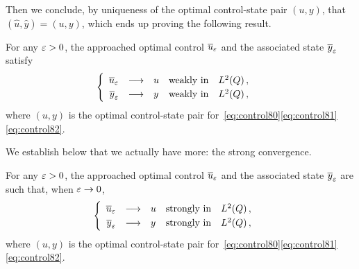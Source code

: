 Then we conclude, by uniqueness of the optimal control-state pair $(u,y)$,
that $\left({\hat{u},\hat{y}}\right) = (u,y)$, which ends up proving the
following result.

\begin{proposition}%
    For any $\varepsilon > 0$, the approached optimal control ${\overline{u}}_{\varepsilon}$ and
    the associated state ${\overline{y}}_{\varepsilon}$ satisfy
    \begin{equation*}
        \begin{cases}\displaystyle
            \begin{array}{rclll}
                {\overline{u}}_{\varepsilon} & \longrightarrow & u & \text{weakly in} &
                L^{2}\!\left({Q}\right),\\
                {\overline{y}}_{\varepsilon} & \longrightarrow & y & \text{weakly in} &
                L^{2}\!\left({Q}\right),
            \end{array}
        \end{cases}
    \end{equation*}
    where $(u,y)$ is the optimal control-state pair
    for~\eqref{eq:control80}\eqref{eq:control81}\eqref{eq:control82}.
\end{proposition}

We establish below that we actually have more: the strong convergence.

\begin{theoreme}%
    For any $\varepsilon > 0$, the approached optimal control ${\overline{u}}_{\varepsilon}$ and
    the associated state ${\overline{y}}_{\varepsilon}$ are such that, when $\varepsilon \to 0$,
    \begin{equation*}
        \begin{cases}\displaystyle
            \begin{array}{rclll}
                {\overline{u}}_{\varepsilon} & \longrightarrow & u & \text{strongly in} &
                L^{2}\!\left({Q}\right),\\
                {\overline{y}}_{\varepsilon} & \longrightarrow & y & \text{strongly in} &
                L^{2}\!\left({Q}\right),
            \end{array}
        \end{cases}
    \end{equation*}
    where $(u,y)$ is the optimal control-state pair
    for~\eqref{eq:control80}\eqref{eq:control81}\eqref{eq:control82}.
\end{theoreme}

